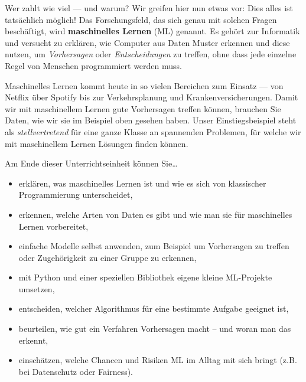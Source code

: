 \begin{lpu}{Wer zahlt wie viel — und warum?}
Wir greifen hier nun etwas vor: Dies alles ist tatsächlich möglich! Das Forschungsfeld, das sich genau mit solchen Fragen beschäftigt, wird \textbf{maschinelles Lernen} (ML) genannt.  Es gehört zur Informatik und versucht zu erklären, wie Computer aus Daten Muster erkennen und diese nutzen, um \textit{Vorhersagen} oder \textit{Entscheidungen} zu treffen, ohne dass jede einzelne Regel von Menschen programmiert werden muss. 

Maschinelles Lernen kommt heute in so vielen Bereichen zum Einsatz — von Netflix über Spotify bis zur Verkehrsplanung und Krankenversicherungen. Damit wir mit maschinellem Lernen gute Vorhersagen treffen können, brauchen Sie Daten, wie wir sie im Beispiel oben gesehen haben. Unser Einstiegsbeispiel steht als \textit{stellvertretend} für eine ganze Klasse an spannenden Problemen, für welche wir mit maschinellem Lernen Lösungen finden können.

\vspace{0.5em}
Am Ende dieser Unterrichtseinheit können Sie…

\begin{itemize}[itemsep=0.3em, parsep=0pt, topsep=0em]
  \item erklären, was maschinelles Lernen ist und wie es sich von klassischer Programmierung unterscheidet,
  \item erkennen, welche Arten von Daten es gibt und wie man sie für maschinelles Lernen vorbereitet,
  \item einfache Modelle selbst anwenden, zum Beispiel um Vorhersagen zu treffen oder Zugehörigkeit zu einer Gruppe zu erkennen,
  \item mit Python und einer speziellen Bibliothek eigene kleine ML-Projekte umsetzen,
  \item entscheiden, welcher Algorithmus für eine bestimmte Aufgabe geeignet ist,
  \item beurteilen, wie gut ein Verfahren Vorhersagen macht – und woran man das erkennt,
  \item einschätzen, welche Chancen und Risiken ML im Alltag mit sich bringt (z.B. bei Datenschutz oder Fairness).
\end{itemize}
    
\end{lpu}